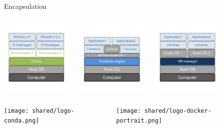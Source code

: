 \begin{frame}{Encapsulation}
\begin{columns}

\begin{center}
    \includegraphics[width=3.5cm]{02_encapsulation/figures/intro_encapsulation_v2-5.pdf}
\end{center}

\begin{center}
\includegraphics[width=3.5cm]{02_encapsulation/figures/intro_encapsulation_v2-10.pdf}
\end{center}

\begin{center}
    \includegraphics[width=3.5cm]{02_encapsulation/figures/intro_encapsulation_v2-8.pdf}
\end{center}

\end{columns}
\begin{columns}

\begin{center}
    \texttt{[image: shared/logo-conda.png]}
\end{center}

\begin{center}
    \texttt{[image: shared/logo-docker-portrait.png]}
\end{center}



\end{columns}

\end{frame}


